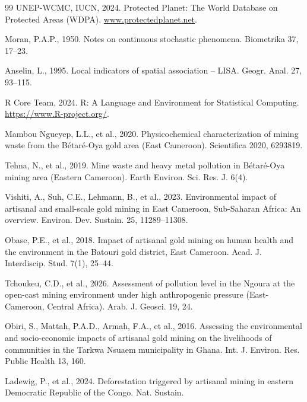 \documentclass[preprint,12pt,number]{elsarticle}
\begin{document}
\begin{thebibliography}{99}
UNEP-WCMC, IUCN, 2024. Protected Planet: The World Database on Protected Areas (WDPA). \url{www.protectedplanet.net}.

Moran, P.A.P., 1950. Notes on continuous stochastic phenomena. Biometrika 37, 17--23.

Anselin, L., 1995. Local indicators of spatial association -- LISA. Geogr. Anal. 27, 93--115.

R Core Team, 2024. R: A Language and Environment for Statistical Computing. \url{https://www.R-project.org/}.

Mambou Ngueyep, L.L., et al., 2020. Physicochemical characterization of mining waste from the B\'{e}tar\'{e}-Oya gold area (East Cameroon). Scientifica 2020, 6293819.

Tehna, N., et al., 2019. Mine waste and heavy metal pollution in B\'{e}tar\'{e}-Oya mining area (Eastern Cameroon). Earth Environ. Sci. Res. J. 6(4).

Vishiti, A., Suh, C.E., Lehmann, B., et al., 2023. Environmental impact of artisanal and small-scale gold mining in East Cameroon, Sub-Saharan Africa: An overview. Environ. Dev. Sustain. 25, 11289--11308.

Obase, P.E., et al., 2018. Impact of artisanal gold mining on human health and the environment in the Batouri gold district, East Cameroon. Acad. J. Interdiscip. Stud. 7(1), 25--44.

Tchoukeu, C.D., et al., 2026. Assessment of pollution level in the Ngoura at the open-cast mining environment under high anthropogenic pressure (East-Cameroon, Central Africa). Arab. J. Geosci. 19, 24.

Obiri, S., Mattah, P.A.D., Armah, F.A., et al., 2016. Assessing the environmental and socio-economic impacts of artisanal gold mining on the livelihoods of communities in the Tarkwa Nsuaem municipality in Ghana. Int. J. Environ. Res. Public Health 13, 160.

Ladewig, P., et al., 2024. Deforestation triggered by artisanal mining in eastern Democratic Republic of the Congo. Nat. Sustain.

\end{thebibliography}
\end{document}
